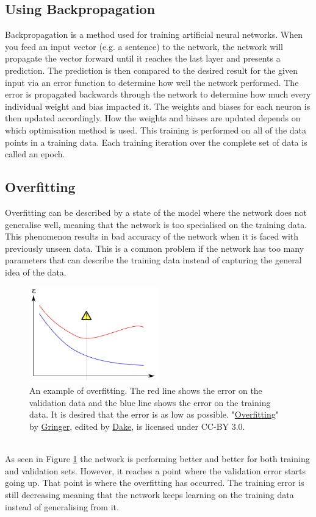 \subsection{Using Backpropagation}\label{sec:backpropagation}
Backpropagation is a method used for training artificial neural networks. When you feed an input vector (e.g. a sentence) to the network, the network will propagate the vector forward until it reaches the last layer and presents a prediction. The prediction is then compared to the desired result for the given input via an error function to determine how well the network performed. The error is propagated backwards through the network to determine how much every individual weight and bias impacted it. The weights and biases for each neuron is then updated accordingly. How the weights and biases are updated depends on which optimisation method is used. This training is performed on all of the data points in a training data. Each training iteration over the complete set of data is called an epoch.

\subsection{Overfitting}\label{sec:overfitting}
Overfitting can be described by a state of the model where the network does not generalise well, meaning that the network is too specialised on the training data. This phenomenon results in bad accuracy of the network when it is faced with previously unseen data. This is a common problem if the network has too many parameters that can describe the training data instead of capturing the general idea of the data.
\begin{figure}[h]
    \centering
    \includegraphics[width=0.5\textwidth]{figure/ann/overfitting}
    \caption{An example of overfitting. The red line shows the error on the validation data and the blue line shows the error on the training data. It is desired that the error is as low as possible. 
    "\href{https://en.wikipedia.org/wiki/Overfitting\#/media/File:Overfitting_svg.svg}{Overfitting}" by
    \href{https://commons.wikimedia.org/wiki/User:Gringer}{Gringer}, edited by
    \href{https://commons.wikimedia.org/wiki/User\:Dake}{Dake}, is licensed under CC-BY 3.0.}
    \label{fig:overfitting}
\end{figure}
\\
As seen in Figure \ref{fig:overfitting} the network is performing better and better for both training and validation sets. However, it reaches a point where the validation error starts going up. That point is where the overfitting has occurred. The training error is still decreasing meaning that the network keeps learning on the training data instead of generalising from it. 

